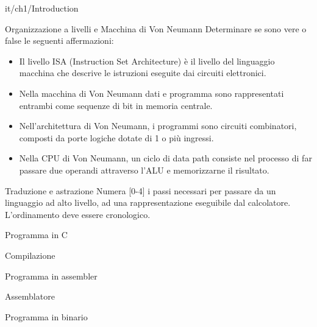 \documentclass[11pt]{article}
\begin{document}
\begin{quiz}{it/ch1/Introduction}

\begin{cloze}[points=1,shuffle=false]{Organizzazione a livelli e Macchina di Von Neumann}
Determinare se sono vere o false le seguenti affermazioni:
\begin{itemize}
    \item Il livello ISA (Instruction Set Architecture) è il livello del linguaggio macchina che descrive le istruzioni eseguite dai circuiti elettronici.
    \item Nella macchina di Von Neumann dati e programma sono rappresentati entrambi come sequenze di bit in memoria centrale.
    \item Nell'architettura di Von Neumann, i programmi sono circuiti combinatori, composti da porte logiche dotate di 1 o più ingressi.
    \item Nella CPU di Von Neumann, un ciclo di data path consiste nel processo di far passare due operandi attraverso l'ALU e memorizzarne il risultato. 
\end{itemize}
\end{cloze}

\begin{matching}[points=1,shuffle=true]{Traduzione e astrazione}
Numera [0-4] i passi necessari per passare da un linguaggio ad alto livello, ad una rappresentazione eseguibile dal calcolatore. L'ordinamento deve essere cronologico.
\item Programma in C            
\item Compilazione              
\item Programma in assembler    
\item Assemblatore              
\item Programma in binario      
\end{matching}


\end{quiz}
\end{document}
